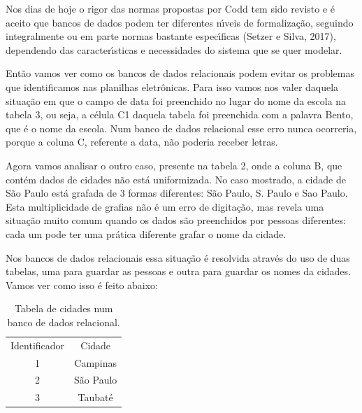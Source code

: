 \documentclass[
12pt,		%
openright,	%
twoside,  %
a4paper,			%
chapter=TITLE,		%
english,			%
french,				%
spanish,			%
brazil				%
]{USPSC-classe/USPSC}
\begin{document}
Nos dias de hoje o rigor das normas propostas por Codd tem sido revisto e \'e aceito que bancos de dados podem ter diferentes n\'{\i}veis de formaliza\c{c}\~ao, seguindo integralmente ou em parte normas bastante espec\'{\i}ficas (Setzer e Silva, 2017), dependendo das caracter\'{\i}sticas e necessidades do sistema que se quer modelar.








Ent\~ao vamos ver como os bancos de dados relacionais podem evitar os problemas que identificamos nas planilhas eletr\^onicas. Para isso vamos nos valer daquela situa\c{c}\~ao em que o campo de data foi preenchido no lugar do nome da escola na tabela 3, ou seja, a c\'elula C1 daquela tabela foi preenchida com a palavra \textquotedbl Bento\textquotedbl , que \'e o nome da escola. Num banco de dados relacional esse erro nunca ocorreria, porque a coluna C, referente a data, n\~ao poderia receber letras.








Agora vamos analisar o outro caso, presente na tabela 2, onde a coluna B, que cont\'em dados de cidades n\~ao est\'a uniformizada. No caso mostrado, a cidade de S\~ao Paulo est\'a grafada de 3 formas diferentes: S\~ao Paulo, S. Paulo e Sao Paulo. Esta multiplicidade de grafias n\~ao \'e um erro de digita\c{c}\~ao, mas revela uma situa\c{c}\~ao muito comum quando os dados s\~ao preenchidos por pessoas diferentes: cada um pode ter uma pr\'atica diferente grafar o nome da cidade.








Nos bancos de dados relacionais essa situa\c{c}\~ao \'e resolvida atrav\'es do uso de duas tabelas, uma para guardar as pessoas e outra para guardar os nomes da cidades. Vamos ver como isso \'e feito abaixo:












\begin{table}[htb]
\tiny
\caption{\label{e4d91173469576e32f3571663aaeb94e34415b3e}Tabela de cidades num banco de dados relacional.}

\centering
\begin{tabular}{|c|c|}
\hline
Identificador  &  Cidade \\
1  &  Campinas \\
2  &  S\~ao Paulo \\
3  &  Taubat\'e \\
\hline
\end{tabular}
\end{table}
\end{document}
